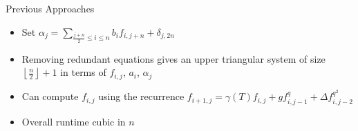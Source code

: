 \documentclass{beamer}
\begin{document}
\begin{frame}{Previous Approaches}

\begin{itemize}

        \item Set $\alpha_j = \sum_{\frac{j+n}{2} \leq i \leq n} b_i f_{i,j + n} + \delta_{j,2n}$
    \item Removing redundant equations gives an upper triangular system of size $\left\lfloor \frac{n}{2} \right\rfloor + 1$ in terms of $f_{i,j}$, $a_i$, $\alpha_j$
    \item Can compute $f_{i,j}$ using the recurrence $f_{i+1,j} = \gamma(T) f_{i,j} + g f_{i,j-1}^q + \Delta f_{i,j-2}^{q^2}$

\item Overall runtime cubic in $n$

\end{itemize}

    
\end{frame}

\end{document}
